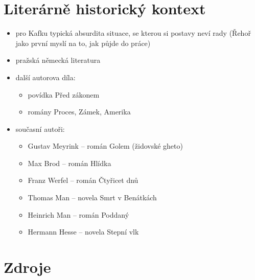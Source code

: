 \documentclass[10pt,a4paper]{article}
\begin{document}
\section*{Literárně historický kontext}
\begin{itemize}
\item pro Kafku typická absurdita situace, se kterou si postavy neví rady (Řehoř jako první myslí na to, jak půjde do práce)
\item pražská německá literatura
\item další autorova díla: 
	\begin{itemize}
	\item povídka Před zákonem
	\item romány Proces, Zámek, Amerika
	\end{itemize}
\item současní autoři:
	\begin{itemize}
	\item Gustav Meyrink -- román Golem (židovské gheto)
	\item Max Brod -- román Hlídka
	\item Franz Werfel -- román Čtyřicet dnů
	\item Thomas Man  -- novela Smrt v Benátkách
	\item Heinrich Man -- román Poddaný
	\item Hermann Hesse -- novela Stepní vlk	
	\end{itemize}
\end{itemize}
\section*{Zdroje}
\end{document}
